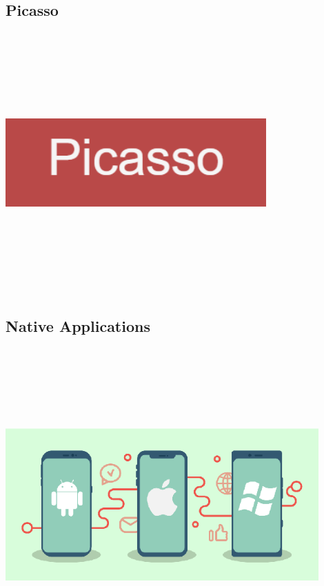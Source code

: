 \subsection{Picasso}
\par
\medskip
\begin{center}
    \includegraphics[width=10cm,height=10cm,keepaspectratio]{Images/picasso.png}
\end{center}

\subsection{Native Applications}
\par
\medskip
\begin{center}
    \includegraphics[width=12cm,height=12cm,keepaspectratio]{Images/nativeapp2.png}
\end{center}


